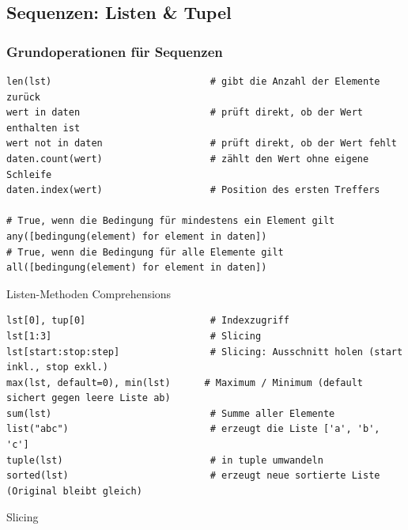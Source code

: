 \subsection{Sequenzen: Listen \& Tupel}\label{sec:01-sequenzen}
\subsubsection{Grundoperationen für Sequenzen}\label{sec:01-operationen-auf-containern}
\begin{codebox}
\begin{lstlisting}[style=CodeExpert]
len(lst)                            # gibt die Anzahl der Elemente zurück
wert in daten                       # prüft direkt, ob der Wert enthalten ist
wert not in daten                   # prüft direkt, ob der Wert fehlt
daten.count(wert)                   # zählt den Wert ohne eigene Schleife
daten.index(wert)                   # Position des ersten Treffers

# True, wenn die Bedingung für mindestens ein Element gilt
any([bedingung(element) for element in daten])
# True, wenn die Bedingung für alle Elemente gilt
all([bedingung(element) for element in daten])
\end{lstlisting}
Listen-Methoden \enspace
Comprehensions 
\end{codebox}

\begin{codebox}
\begin{lstlisting}[style=CodeExpert]
lst[0], tup[0]                      # Indexzugriff
lst[1:3]                            # Slicing
lst[start:stop:step]                # Slicing: Ausschnitt holen (start inkl., stop exkl.)
max(lst, default=0), min(lst)      # Maximum / Minimum (default sichert gegen leere Liste ab)
sum(lst)                            # Summe aller Elemente
list("abc")                         # erzeugt die Liste ['a', 'b', 'c']
tuple(lst)                          # in tuple umwandeln
sorted(lst)                         # erzeugt neue sortierte Liste (Original bleibt gleich)
\end{lstlisting}
Slicing 
\end{codebox}

